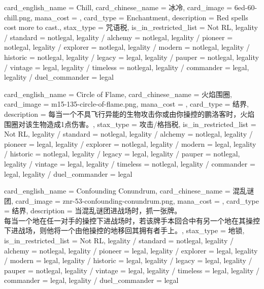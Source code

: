 \documentclass[lang = cn, color = black, 10pt]{AllThatStax}
\begin{document}
\card
{
	card_english_name = {Chill},
	card_chinese_name = {冰冷},
	card_image = 6ed-60-chill.png,
	mana_cost = ,
	card_type = Enchantment,
	description = {Red spells cost  more to cast.},
	stax_type = 咒语税,
	is_in_restricted_list = Not RL,
	legality / standard = notlegal,
	legality / alchemy = notlegal,
	legality / pioneer = notlegal,
	legality / explorer = notlegal,
	legality / modern = notlegal,
	legality / historic = notlegal,
	legality / legacy = legal,
	legality / pauper = notlegal,
	legality / vintage = legal,
	legality / timeless = notlegal,
	legality / commander = legal,
	legality / duel_commander = legal
}

\card
{
	card_english_name = {Circle of Flame},
	card_chinese_name = {火焰围圈},
	card_image = m15-135-circle-of-flame.png,
	mana_cost = ,
	card_type = 结界,
	description = {每当一个不具飞行异能的生物攻击你或由你操控的鹏洛客时，火焰围圈对该生物造成1点伤害。},
	stax_type = 攻击/格挡税,
	is_in_restricted_list = Not RL,
	legality / standard = notlegal,
	legality / alchemy = notlegal,
	legality / pioneer = legal,
	legality / explorer = notlegal,
	legality / modern = legal,
	legality / historic = notlegal,
	legality / legacy = legal,
	legality / pauper = notlegal,
	legality / vintage = legal,
	legality / timeless = notlegal,
	legality / commander = legal,
	legality / duel_commander = legal
}

\card
{
	card_english_name = {Confounding Conundrum},
	card_chinese_name = {混乱谜团},
	card_image = znr-53-confounding-conundrum.png,
	mana_cost = ,
	card_type = 结界,
	description = {当混乱谜团进战场时，抓一张牌。\\
		每当一个地在任一对手的操控下进战场时，若该牌手本回合中有另一个地在其操控下进战场，则他将一个由他操控的地移回其拥有者手上。},
	stax_type = 地锁,
	is_in_restricted_list = Not RL,
	legality / standard = notlegal,
	legality / alchemy = notlegal,
	legality / pioneer = legal,
	legality / explorer = legal,
	legality / modern = legal,
	legality / historic = legal,
	legality / legacy = legal,
	legality / pauper = notlegal,
	legality / vintage = legal,
	legality / timeless = legal,
	legality / commander = legal,
	legality / duel_commander = legal
}
\end{document}
